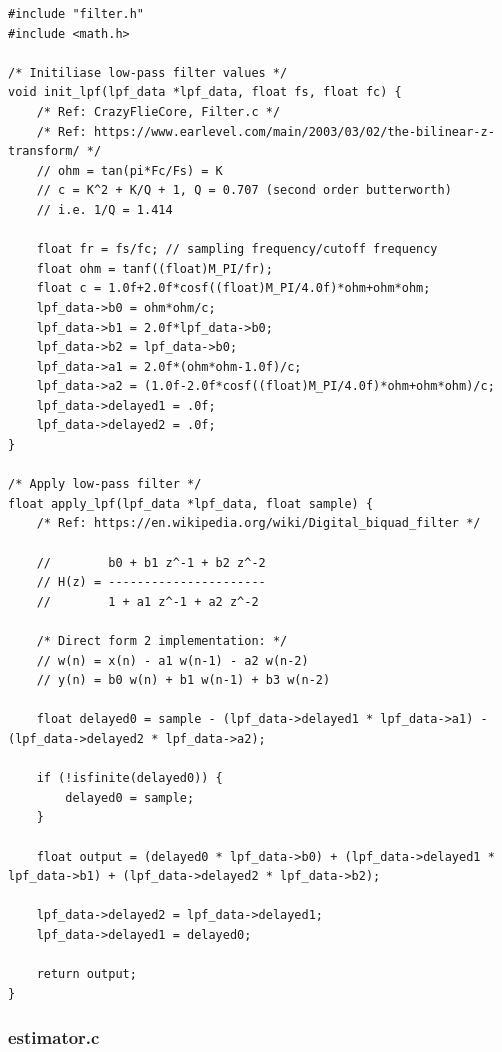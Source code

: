 \begin{lstlisting}
#include "filter.h"
#include <math.h>

/* Initiliase low-pass filter values */
void init_lpf(lpf_data *lpf_data, float fs, float fc) {
    /* Ref: CrazyFlieCore, Filter.c */
    /* Ref: https://www.earlevel.com/main/2003/03/02/the-bilinear-z-transform/ */
    // ohm = tan(pi*Fc/Fs) = K
    // c = K^2 + K/Q + 1, Q = 0.707 (second order butterworth)
    // i.e. 1/Q = 1.414

    float fr = fs/fc; // sampling frequency/cutoff frequency
    float ohm = tanf((float)M_PI/fr);
    float c = 1.0f+2.0f*cosf((float)M_PI/4.0f)*ohm+ohm*ohm; 
    lpf_data->b0 = ohm*ohm/c;
    lpf_data->b1 = 2.0f*lpf_data->b0;
    lpf_data->b2 = lpf_data->b0;
    lpf_data->a1 = 2.0f*(ohm*ohm-1.0f)/c;
    lpf_data->a2 = (1.0f-2.0f*cosf((float)M_PI/4.0f)*ohm+ohm*ohm)/c;
    lpf_data->delayed1 = .0f;
    lpf_data->delayed2 = .0f;
}

/* Apply low-pass filter */
float apply_lpf(lpf_data *lpf_data, float sample) {
    /* Ref: https://en.wikipedia.org/wiki/Digital_biquad_filter */

    //        b0 + b1 z^-1 + b2 z^-2 
    // H(z) = ---------------------- 
    //        1 + a1 z^-1 + a2 z^-2  

    /* Direct form 2 implementation: */
    // w(n) = x(n) - a1 w(n-1) - a2 w(n-2) 
    // y(n) = b0 w(n) + b1 w(n-1) + b3 w(n-2) 
    
    float delayed0 = sample - (lpf_data->delayed1 * lpf_data->a1) - (lpf_data->delayed2 * lpf_data->a2);
    
    if (!isfinite(delayed0)) {
        delayed0 = sample;
    }
        
    float output = (delayed0 * lpf_data->b0) + (lpf_data->delayed1 * lpf_data->b1) + (lpf_data->delayed2 * lpf_data->b2);

    lpf_data->delayed2 = lpf_data->delayed1;
    lpf_data->delayed1 = delayed0;

    return output;
}
\end{lstlisting}
\pagebreak
\subsubsection{estimator.c}

